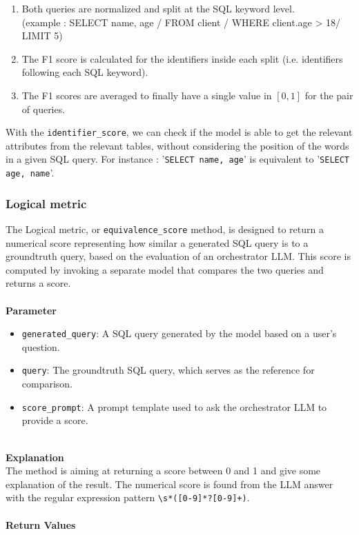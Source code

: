 \documentclass[12pt,a4paper]{article}
\begin{document}
\begin{enumerate}
    \item Both queries are normalized and split at the SQL keyword level. \\ (example : SELECT name, age / FROM client / WHERE client.age > 18/ LIMIT 5)
    \item The F1 score is calculated for the identifiers inside each split (i.e. identifiers following each SQL keyword).
    \item The F1 scores are averaged to finally have a single value in $[0, 1]$ for the pair of queries.
\end{enumerate}

With the \texttt{identifier\_score}, we can check if the model is able to get the relevant attributes from the relevant tables, without considering the position of the words in a given SQL query.
For instance : '\texttt{SELECT name, age}' is equivalent to '\texttt{SELECT age, name}'.

\subsubsection*{Logical metric}

The Logical metric, or \texttt{equivalence\_score} method, is designed to return a numerical score representing how similar a generated SQL query is to a groundtruth query, based on the evaluation of an orchestrator LLM. This score is computed by invoking a separate model that compares the two queries and returns a score.
\\
\\
\textbf{Parameter}
\begin{itemize}
    \item \texttt{generated\_query}: A SQL query generated by the model based on a user's question.
    \item \texttt{query}: The groundtruth SQL query, which serves as the reference for comparison.
    \item \texttt{score\_prompt}: A prompt template used to ask the orchestrator LLM to provide a score.
\end{itemize}
\\
\textbf{Explanation}
\\

The method is aiming at returning a score between 0 and 1 and give some explanation of the result. The numerical score is found from the LLM answer with the regular expression pattern \texttt{\textbackslash s*([0-9]*\.?[0-9]+)}.
\\
\\
\textbf{Return Values}
\\
\end{document}
